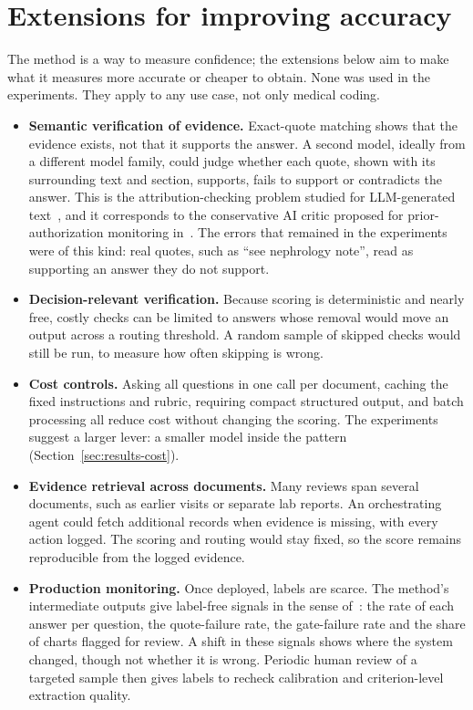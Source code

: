 \documentclass[10pt,letterpaper]{article}
\begin{document}
\section{Extensions for improving accuracy}

The method is a way to measure confidence; the extensions below aim to make what it measures more accurate or cheaper to obtain. None was used in the experiments. They apply to any use case, not only medical coding.
\begin{itemize}
  \item \textbf{Semantic verification of evidence.} Exact-quote matching shows that the evidence exists, not that it supports the answer. A second model, ideally from a different model family, could judge whether each quote, shown with its surrounding text and section, supports, fails to support or contradicts the answer. This is the attribution-checking problem studied for LLM-generated text~\cite{rashkin,gao,yue}, and it corresponds to the conservative AI critic proposed for prior-authorization monitoring in~\cite{zeinoun}. The errors that remained in the experiments were of this kind: real quotes, such as ``see nephrology note'', read as supporting an answer they do not support.
  \item \textbf{Decision-relevant verification.} Because scoring is deterministic and nearly free, costly checks can be limited to answers whose removal would move an output across a routing threshold. A random sample of skipped checks would still be run, to measure how often skipping is wrong.
  \item \textbf{Cost controls.} Asking all questions in one call per document, caching the fixed instructions and rubric, requiring compact structured output, and batch processing all reduce cost without changing the scoring. The experiments suggest a larger lever: a smaller model inside the pattern (Section~\ref{sec:results-cost}).
  \item \textbf{Evidence retrieval across documents.} Many reviews span several documents, such as earlier visits or separate lab reports. An orchestrating agent could fetch additional records when evidence is missing, with every action logged. The scoring and routing would stay fixed, so the score remains reproducible from the logged evidence.
  \item \textbf{Production monitoring.} Once deployed, labels are scarce. The method's intermediate outputs give label-free signals in the sense of~\cite{zeinoun}: the rate of each answer per question, the quote-failure rate, the gate-failure rate and the share of charts flagged for review. A shift in these signals shows where the system changed, though not whether it is wrong. Periodic human review of a targeted sample then gives labels to recheck calibration and criterion-level extraction quality.
\end{itemize}
\end{document}
